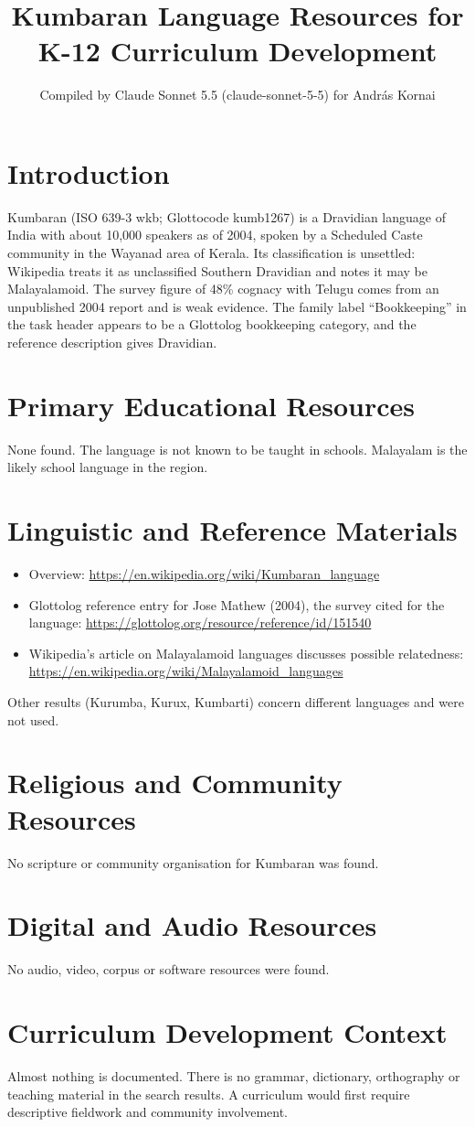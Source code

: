 \documentclass[12pt]{article}
\title{Kumbaran Language Resources for K-12 Curriculum Development}
\author{Compiled by Claude Sonnet 5.5 (claude-sonnet-5-5) for Andr\'as Kornai}
\date{}
\begin{document}
\maketitle

\section{Introduction}
Kumbaran (ISO 639-3 wkb; Glottocode kumb1267) is a Dravidian language of India with about 10,000 speakers as of 2004, spoken by a Scheduled Caste community in the Wayanad area of Kerala. Its classification is unsettled: Wikipedia treats it as unclassified Southern Dravidian and notes it may be Malayalamoid. The survey figure of 48\% cognacy with Telugu comes from an unpublished 2004 report and is weak evidence. The family label ``Bookkeeping'' in the task header appears to be a Glottolog bookkeeping category, and the reference description gives Dravidian.

\section{Primary Educational Resources}
None found. The language is not known to be taught in schools. Malayalam is the likely school language in the region.

\section{Linguistic and Reference Materials}
\begin{itemize}
\item Overview: \url{https://en.wikipedia.org/wiki/Kumbaran_language}
\item Glottolog reference entry for Jose Mathew (2004), the survey cited for the language: \url{https://glottolog.org/resource/reference/id/151540}
\item Wikipedia's article on Malayalamoid languages discusses possible relatedness: \url{https://en.wikipedia.org/wiki/Malayalamoid_languages}
\end{itemize}
Other results (Kurumba, Kurux, Kumbarti) concern different languages and were not used.

\section{Religious and Community Resources}
No scripture or community organisation for Kumbaran was found.

\section{Digital and Audio Resources}
No audio, video, corpus or software resources were found.

\section{Curriculum Development Context}
Almost nothing is documented. There is no grammar, dictionary, orthography or teaching material in the search results. A curriculum would first require descriptive fieldwork and community involvement.
\end{document}
